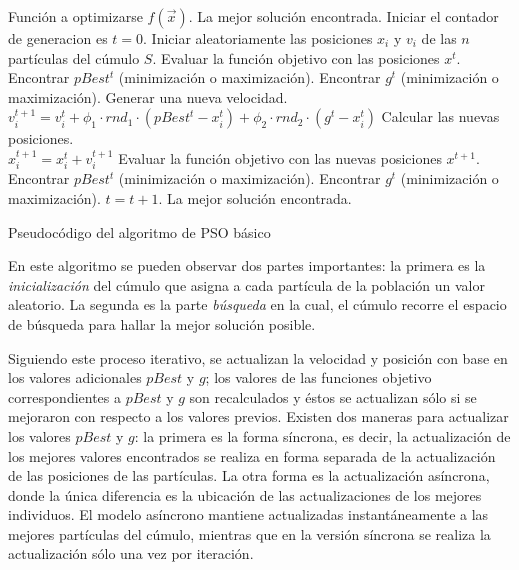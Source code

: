     \begin{algorithm}
    \begin{algorithmic}[1]
	\REQUIRE Funci\'on a optimizarse $f\left(\vec{x}\right)$.
	\ENSURE La mejor soluci\'on encontrada.
	\STATE Iniciar el contador de generacion es $t=0$.
	\STATE Iniciar aleatoriamente las posiciones $x_i$ y $v_i$ de las $n$ part\'iculas del c\'umulo $S$.
	\STATE Evaluar la funci\'on objetivo con las posiciones $x^{t}$.
	\STATE Encontrar $pBest^t$ (minimizaci\'on o maximizaci\'on). 
	\STATE Encontrar $g^t$ (minimizaci\'on o maximizaci\'on).
		  \STATE Generar una nueva velocidad.
		  \\ $v^{t+1}_{i}=v^{t}_{i}+\phi_{1}\cdot rnd_{1} \cdot \left(pBest^{t}-x^{t}_{i}\right) 
				            +\phi_{2}\cdot rnd_{2} \cdot \left(g^{t}-x^{t}_{i}\right)$
		  \STATE Calcular las nuevas posiciones. 
		  \\$x^{t+1}_{i}=x^{t}_{i}+v^{t+1}_{i}$
		  \STATE Evaluar la funci\'on objetivo con las nuevas posiciones $x^{t+1}$.
		\ENDFOR
		\STATE Encontrar $pBest^t$ (minimizaci\'on o maximizaci\'on). 
		\STATE Encontrar $g^t$ (minimizaci\'on o maximizaci\'on).
		\STATE $t=t+1$.
	\ENDWHILE
	\RETURN La mejor soluci\'on encontrada.
	\end{algorithmic}
	\caption{Pseudoc\'odigo del algoritmo de PSO b\'asico}
	\label{alg:PSO}
	\end{algorithm}

	En este algoritmo se pueden observar dos partes importantes: la primera es la \textit{inicializaci\'on} del c\'umulo que asigna a cada 
	part\'icula de la poblaci\'on un valor aleatorio. La segunda es la parte \textit{b\'usqueda} en la cual, el c\'umulo recorre el espacio
	de b\'usqueda para hallar la mejor soluci\'on posible. 
	
	Siguiendo este proceso iterativo, se actualizan la velocidad y posici\'on con base en los valores adicionales $pBest$ y $g$; los  
	valores de las funciones objetivo correspondientes a $pBest$ y $g$ son recalculados y \'estos se actualizan s\'olo si se mejoraron 
	con respecto a los valores previos. Existen dos maneras para actualizar los valores $pBest$ y $g$: la primera es la forma s\'incrona, es 
	decir, la actualizaci\'on de los mejores valores encontrados se realiza en forma 
	separada de la actualizaci\'on de las posiciones de las part\'iculas. La otra forma es la actualizaci\'on as\'incrona, donde la \'unica 
	diferencia es la ubicaci\'on de las actualizaciones de los mejores individuos. El modelo as\'incrono mantiene actualizadas 
	instant\'aneamente a las mejores part\'iculas del c\'umulo, mientras que en la versi\'on s\'incrona se realiza la actualizaci\'on s\'olo 
	una vez por iteraci\'on.
    
